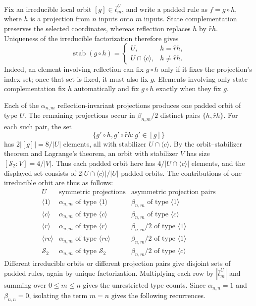 \documentclass[11pt,a4paper]{article}
\newenvironment{revision}{\color{blue}}{}
\newenvironment{revision}{\color{black}}{}
\newcommand{\locmark}[1]{\label{#1}\linelabel{line:#1}}
\newcommand{\stab}{\mathop{\mathrm{stab}}\nolimits}
\begin{document}
\begin{revision}
\locmark{loc:stabilizer-proof}
Fix an irreducible local orbit $[g]\in\overline t_m^U$, and write a
padded rule as $f=g\circ h$, where $h$ is a projection from $n$ inputs
onto $m$ inputs. State complementation preserves the selected
coordinates, whereas reflection replaces $h$ by $\hat rh$. Uniqueness
of the irreducible factorization therefore gives
\begin{equation}\label{eq:projection-stabilizer}
\stab(g\circ h)=
\begin{cases}
U,&h=\hat rh,\\
U\cap\langle c\rangle,&h\ne\hat rh.
\end{cases}
\end{equation}
Indeed, an element involving reflection can fix $g\circ h$ only if it
fixes the projection's index set; once that set is fixed, it must also
fix $g$. Elements involving only state complementation fix $h$
automatically and fix $g\circ h$ exactly when they fix $g$.

Each of the $\alpha_{n,m}$ reflection-invariant projections produces
one padded orbit of type $U$. The remaining projections occur in
$\beta_{n,m}/2$ distinct pairs $\{h,\hat rh\}$. For each such pair,
the set
\[
\{g'\circ h,g'\circ\hat rh:g'\in[g]\}
\]
has $2|[g]|=8/|U|$ elements, all with stabilizer
$U\cap\langle c\rangle$. By the orbit--stabilizer theorem and
Lagrange's theorem, an orbit with stabilizer $V$ has size
$[\mathcal S_2:V]=4/|V|$. Thus each padded orbit here has
$4/|U\cap\langle c\rangle|$ elements, and the displayed set consists of
$2|U\cap\langle c\rangle|/|U|$ padded orbits. The contributions
of one irreducible orbit are thus as follows:
\[
\begin{array}{c|c|c}
U&\text{symmetric projections}&\text{asymmetric projection pairs}\\\hline
\langle1\rangle&\alpha_{n,m}\text{ of type }\langle1\rangle
 &\beta_{n,m}\text{ of type }\langle1\rangle\\
\langle c\rangle&\alpha_{n,m}\text{ of type }\langle c\rangle
 &\beta_{n,m}\text{ of type }\langle c\rangle\\
\langle r\rangle&\alpha_{n,m}\text{ of type }\langle r\rangle
 &\beta_{n,m}/2\text{ of type }\langle1\rangle\\
\langle rc\rangle&\alpha_{n,m}\text{ of type }\langle rc\rangle
 &\beta_{n,m}/2\text{ of type }\langle1\rangle\\
\mathcal S_2&\alpha_{n,m}\text{ of type }\mathcal S_2
 &\beta_{n,m}/2\text{ of type }\langle c\rangle
\end{array}
\]
Different irreducible orbits or different projection pairs give disjoint
sets of padded rules, again by unique factorization. Multiplying each
row by $|\overline t_m^U|$ and summing over $0\leq m\leq n$ gives
the unrestricted type counts. Since $\alpha_{n,n}=1$ and
$\beta_{n,n}=0$, isolating the term $m=n$ gives the following recurrences.
\end{revision}
\end{document}
